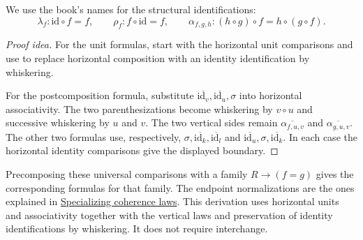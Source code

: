 \documentclass[11pt]{article}
\begin{document}
We use the book's names for the structural identifications:
\[
 \lambda_f\colon\mathrm{id}\circ f=f,\qquad
 \rho_f\colon f\circ\mathrm{id}=f,\qquad
 \alpha_{f,g,h}\colon(h\circ g)\circ f=h\circ(g\circ f).
\]

\begin{proof}[Proof idea]
For the unit formulas, start with the horizontal unit comparisons and use
 to replace horizontal
composition with an identity identification by whiskering.

For the postcomposition formula, substitute
$\overline{\mathrm{id}_v},\overline{\mathrm{id}_u},\sigma$ into horizontal
associativity. The two parenthesizations become whiskering by $v\circ u$
and successive whiskering by $u$ and $v$. The two vertical sides remain
$\overline{\alpha_{f,u,v}}$ and $\overline{\alpha_{g,u,v}}$.
The other two formulas use, respectively,
$\sigma,\overline{\mathrm{id}_k},\overline{\mathrm{id}_l}$ and
$\overline{\mathrm{id}_u},\sigma,\overline{\mathrm{id}_k}$.
In each case the horizontal identity comparisons give the displayed boundary.
\end{proof}

Precomposing these universal comparisons with a family
$R\to(f=g)$ gives the corresponding formulas for that family. The endpoint
normalizations are the ones explained in
\href{supplementary-specializing-coherence-laws.html}{Specializing coherence laws}.
This derivation uses horizontal units and associativity together with the
vertical laws and preservation of identity identifications by whiskering.
It does not require interchange.
\end{document}
